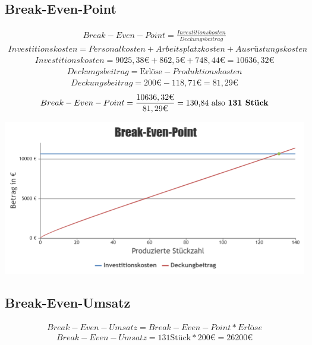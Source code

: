 \documentclass[paper=a4, 12pt]{scrreprt}
\begin{document}
		\subsection{Break-Even-Point}\hfill \break
		\begin{align*} 
		Break-Even-Point = \frac{Investitionskosten}{Deckungsbeitrag}
		\end{align*} 
		\begin{align*} 
		Investitionskosten = Personalkosten + Arbeitsplatzkosten + Ausrüstungskosten
		\end{align*} 
		\begin{align*} 
		Investitionskosten = 9025,38\text{€} + 862,5\text{€} + 748,44\text{€} = 10636,32\text{€}
		\end{align*} 
		\begin{align*} 
		Deckungsbeitrag = \text{Erlöse} - Produktionskosten
		\end{align*} 
		\begin{align*}
		Deckungsbeitrag = 200\text{€} - 118,71\text{€} = 81,29\text{€}
		\end{align*} 
		\begin{align*} 
		Break-Even-Point = \frac{10636,32\text{€}}{81,29\text{€}} = \text{130,84 also \textbf{131 Stück}}
		\end{align*} 
		\begin{adjustbox}{center,caption={Brek-Even-Point},label={fig:BEP.PNG},nofloat=figure,vspace=\bigskipamount}
			\includegraphics[width=\textwidth]{img/BEP.PNG}
		\end{adjustbox}
			
		\subsection{Break-Even-Umsatz}\hfill \break
		\begin{align*} 
		Break-Even-Umsatz = Break-Even-Point * Erlöse
		\end{align*} 
		\begin{align*} 
		Break-Even-Umsatz = 131 \text{Stück} * 200\text{€} = 26200\text{€}
		\end{align*} 
\newpage
			
\end{document}
